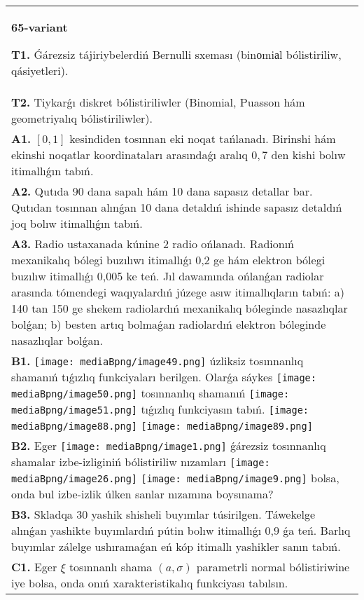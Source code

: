 \documentclass{article}
\begin{document}
\begin{tabular}{m{17cm}}
\textbf{65-variant}
\newline

\textbf{T1.} Ǵárezsiz tájiriybelerdiń Bernulli sxeması (binоmiаl bólistiriliw, qásiyetleri).
 \\
\textbf{T2.} Tiykarǵı diskret bólistiriliwler (Binomial, Puasson hám geometriyalıq bólistiriliwler).
 \\
\textbf{A1.} $\left[ 0,1 \right]$ kesindiden tosınnan eki noqat tańlanadı. Birinshi hám ekinshi noqatlar koordinataları arasındaǵı aralıq $0,7$ den kishi bolıw itimallıǵın tabıń.
 \\
\textbf{A2.} Qutıda 90 dana sapalı hám 10 dana sapasız detallar bar. Qutıdan tosınnan alınǵan 10 dana detaldıń ishinde sapasız detaldıń joq bolıw itimallıǵın tabıń.
 \\
\textbf{A3.} Radio ustaxanada kúnine 2 radio ońlanadı. Radionıń mexanikalıq bólegi buzılıwı itimallıǵı 0,2 ge hám elektron bólegi buzılıw itimallıǵı 0,005 ke teń. Jıl dawamında ońlanǵan radiolar arasında tómendegi waqıyalardıń júzege asıw itimallıqların tabıń: a) 140 tan 150 ge shekem radiolardıń mexanikalıq bóleginde nasazlıqlar bolǵan; b) besten artıq bolmaǵan radiolardıń elektron bóleginde nasazlıqlar bolǵan.
 \\
\textbf{B1.} \texttt{[image: mediaBpng/image49.png]} úzliksiz tosınnanlıq shamanıń tıǵızlıq funkciyaları berilgen. Olarǵa sáykes \texttt{[image: mediaBpng/image50.png]} tosınnanlıq shamanıń \texttt{[image: mediaBpng/image51.png]} tıǵızlıq funkciyasın tabıń. \texttt{[image: mediaBpng/image88.png]} \texttt{[image: mediaBpng/image89.png]}
 \\
\textbf{B2.} Eger \texttt{[image: mediaBpng/image1.png]} ǵárezsiz tosınnanlıq shamalar izbe-izliginiń bólistiriliw nızamları
\texttt{[image: mediaBpng/image26.png]} \texttt{[image: mediaBpng/image9.png]}
bolsa, onda bul izbe-izlik úlken sanlar nızamına boysınama?
 \\
\textbf{B3.} Skladqa 30 yashik shisheli buyımlar túsirilgen. Táwekelge alınǵan yashikte buyımlardıń pútin bolıw itimallıǵı 0,9 ǵa teń. Barlıq buyımlar zálelge ushıramaǵan eń kóp itimallı yashikler sanın tabıń.
 \\
\textbf{C1.} Eger \(\xi\) tosınnanlı shama \((a,\sigma)\) parametrli normal bólistiriwine iye bolsa, onda onıń xarakteristikalıq funkciyası tabılsın.

\end{tabular}
\end{document}
